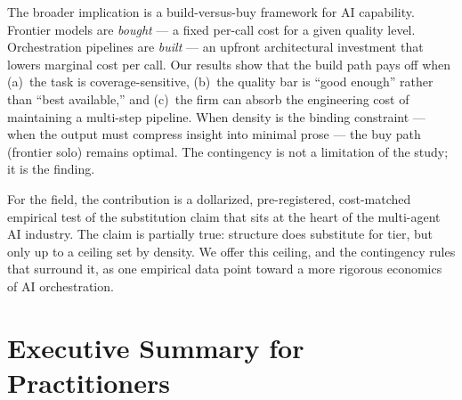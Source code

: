 \documentclass[12pt,a4paper]{article}
\begin{document}
The broader implication is a build-versus-buy framework for AI capability.
Frontier models are \emph{bought} --- a fixed per-call cost for a given quality
level. Orchestration pipelines are \emph{built} --- an upfront architectural
investment that lowers marginal cost per call. Our results show that the build
path pays off when (a)~the task is coverage-sensitive, (b)~the quality bar is
``good enough'' rather than ``best available,'' and (c)~the firm can absorb the
engineering cost of maintaining a multi-step pipeline. When density is the
binding constraint --- when the output must compress insight into minimal prose
--- the buy path (frontier solo) remains optimal. The contingency is not a
limitation of the study; it is the finding.

For the field, the contribution is a dollarized, pre-registered, cost-matched
empirical test of the substitution claim that sits at the heart of the
multi-agent AI industry. The claim is partially true: structure does substitute
for tier, but only up to a ceiling set by density. We offer this ceiling, and
the contingency rules that surround it, as one empirical data point toward a
more rigorous economics of AI orchestration.

\clearpage
\appendix

\section{Executive Summary for Practitioners}\label{sec:exec-summary}
\end{document}

